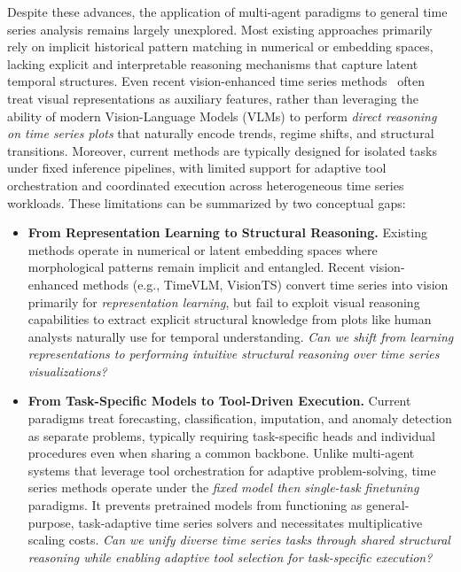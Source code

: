 Despite these advances, the application of multi-agent paradigms to general time series analysis remains largely unexplored.
Most existing approaches primarily rely on implicit historical pattern matching in numerical or embedding spaces, lacking explicit and interpretable reasoning mechanisms that capture latent temporal structures.
Even recent vision-enhanced time series methods~\cite{chen2024visiontsvisualmaskedautoencoders,zhong2025time,ruan2025vision} often treat visual representations as auxiliary features, rather than leveraging the ability of modern Vision-Language Models (VLMs) to perform \emph{direct reasoning on time series plots} that naturally encode trends, regime shifts, and structural transitions.
Moreover, current methods are typically designed for isolated tasks under fixed inference pipelines, with limited support for adaptive tool orchestration and coordinated execution across heterogeneous time series workloads.
These limitations can be summarized by two conceptual gaps:
\begin{itemize}[leftmargin=*, itemsep=0pt]
\item \textbf{From Representation Learning to Structural Reasoning.}
Existing methods operate in numerical or latent embedding spaces where morphological patterns remain implicit and entangled.
Recent vision-enhanced methods (e.g., TimeVLM, VisionTS) convert time series into vision primarily for \emph{representation learning}, but fail to exploit visual reasoning capabilities to extract explicit structural knowledge from plots like human analysts naturally use for temporal understanding.
\textit{Can we shift from learning representations to performing intuitive structural reasoning over time series visualizations?}

\item \textbf{From Task-Specific Models to Tool-Driven Execution.}
Current paradigms treat forecasting, classification, imputation, and anomaly detection as separate problems, typically requiring task-specific heads and individual procedures even when sharing a common backbone.
Unlike multi-agent systems that leverage tool orchestration for adaptive problem-solving, time series methods operate under the \textit{fixed model then single-task finetuning} paradigms.
It prevents pretrained models from functioning as general-purpose, task-adaptive time series solvers and necessitates multiplicative scaling costs.
\textit{Can we unify diverse time series tasks through shared structural reasoning while enabling adaptive tool selection for task-specific execution?}
\end{itemize}

